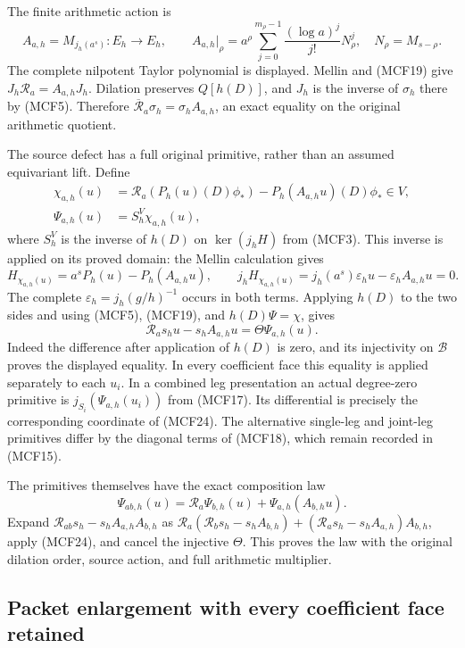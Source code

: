 \documentclass[11pt,a4paper]{article}
\begin{document}
The finite arithmetic action is
\[
A_{a,h}=M_{j_h(a^s)}:E_h\longrightarrow E_h,\qquad
A_{a,h}|_\rho=a^\rho\sum_{j=0}^{m_\rho-1}
             \frac{(\log a)^j}{j!}N_\rho^j,\quad N_\rho=M_{s-\rho}.
\tag{MCF21}
\]
The complete nilpotent Taylor polynomial is displayed.  Mellin and (MCF19)
give $J_h\mathcal R_a=A_{a,h}J_h$.  Dilation preserves $Q[h(D)]$, and
$J_h$ is the inverse of $\sigma_h$ there by (MCF5).  Therefore
$\overline{\mathcal R}_a\sigma_h=\sigma_hA_{a,h}$, an exact equality
on the original arithmetic quotient.

The source defect has a full original primitive, rather than an assumed
equivariant lift.  Define
\[
\begin{split}
\chi_{a,h}(u)&=\mathcal R_a(P_h(u)(D)\phi_*)
                       -P_h(A_{a,h}u)(D)\phi_*\in V,\\
\Psi_{a,h}(u)&=S_h^V\chi_{a,h}(u),
\end{split}
\tag{MCF22}
\]
where $S_h^V$ is the inverse of $h(D)$ on $\ker(j_hH)$ from (MCF3).
This inverse is applied on its proved domain: the Mellin calculation gives
\[
H_{\chi_{a,h}(u)}=a^sP_h(u)-P_h(A_{a,h}u),\qquad
j_hH_{\chi_{a,h}(u)}
 =j_h(a^s)\varepsilon_hu-\varepsilon_hA_{a,h}u=0.
\tag{MCF23}
\]
The complete $\varepsilon_h=j_h(g/h)^{-1}$ occurs in both terms.
Applying $h(D)$ to the two sides and using (MCF5), (MCF19), and
$h(D)\Psi=\chi$, gives
\[
\mathcal R_as_hu-s_hA_{a,h}u=\Theta\Psi_{a,h}(u).
\tag{MCF24}
\]
Indeed the difference after application of $h(D)$ is zero, and its
injectivity on $\mathscr B$ proves the displayed equality.  In every
coefficient face this equality is applied separately to each $u_i$.
In a combined leg presentation an actual degree-zero primitive is
$j_{S_i}(\Psi_{a,h}(u_i))$ from (MCF17).  Its differential is precisely
the corresponding coordinate of (MCF24).  The alternative single-leg
and joint-leg primitives differ by the diagonal terms of (MCF18),
which remain recorded in (MCF15).

The primitives themselves have the exact composition law
\[
\Psi_{ab,h}(u)=\mathcal R_a\Psi_{b,h}(u)
                         +\Psi_{a,h}(A_{b,h}u).
\tag{MCF25}
\]
Expand $\mathcal R_{ab}s_h-s_hA_{a,h}A_{b,h}$ as
$\mathcal R_a(\mathcal R_bs_h-s_hA_{b,h})
 +(\mathcal R_as_h-s_hA_{a,h})A_{b,h}$, apply (MCF24), and cancel the
injective $\Theta$.  This proves the law with the original dilation
order, source action, and full arithmetic multiplier.

\subsection{Packet enlargement with every coefficient face retained}
\end{document}

